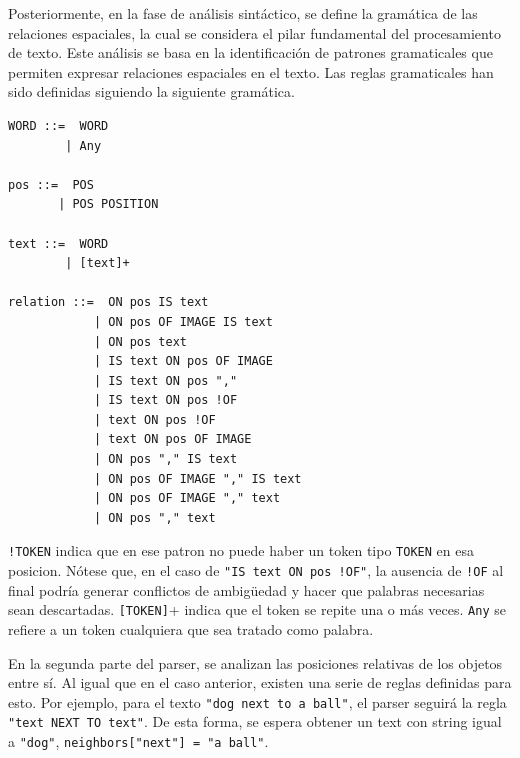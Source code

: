 Posteriormente, en la fase de análisis sintáctico, se define la gramática de las relaciones espaciales, la cual se considera el pilar fundamental del procesamiento de texto. Este análisis se basa en la identificación de patrones gramaticales que permiten expresar relaciones espaciales en el texto. Las reglas gramaticales han sido definidas siguiendo la siguiente gram\'atica.
 
\begin{verbatim}
WORD ::=  WORD
        | Any
    
pos ::=  POS
       | POS POSITION 

text ::=  WORD
        | [text]+
        
relation ::=  ON pos IS text
            | ON pos OF IMAGE IS text
            | ON pos text
            | IS text ON pos OF IMAGE
            | IS text ON pos ","
            | IS text ON pos !OF
            | text ON pos !OF
            | text ON pos OF IMAGE
            | ON pos "," IS text
            | ON pos OF IMAGE "," IS text
            | ON pos OF IMAGE "," text
            | ON pos "," text
\end{verbatim}

\verb|!TOKEN| indica que en ese patron no puede haber un token tipo \verb|TOKEN| en esa posicion. N\'otese que, en el caso de \verb|"IS text ON pos !OF"|, la ausencia de \verb|!OF| al final podría generar conflictos de ambigüedad y hacer que palabras necesarias sean descartadas. \verb|[TOKEN]|+ indica que el token se repite una o m\'as veces. \verb|Any| se refiere a un token cualquiera que sea tratado como palabra.

En la segunda parte del parser, se analizan las posiciones relativas de los objetos entre sí. Al igual que en el caso anterior, existen una serie de reglas definidas para esto. Por ejemplo, para el texto \verb|"dog next to a ball"|, el parser seguirá la regla \verb|"text NEXT TO text"|. De esta forma, se espera obtener un text con string igual a \verb|"dog"|, \verb|neighbors["next"] = "a ball"|.


